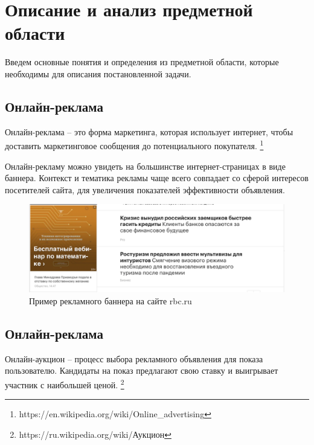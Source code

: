 \documentclass[times,specification,annotation]{itmo-student-thesis}
\begin{document}
\chapter{Описание и анализ предметной области}

Введем основные понятия и определения из предметной области, которые необходимы для описания постановленной задачи.

\section{Онлайн-реклама}

\begin{definition}
    Онлайн-реклама – это форма маркетинга, которая использует интернет,
    чтобы доставить маркетинговое сообщения до потенциального покупателя.
    \footnote{https://en.wikipedia.org/wiki/Online_advertising}
\end{definition}

Онлайн-рекламу можно увидеть на большинстве интернет-страницах в виде баннера.
Контекст и тематика рекламы чаще всего совпадает со сферой интересов посетителей сайта,
для увеличения показателей эффективности объявления.

\begin{figure}[h]
    \label{fig:banner}
    \caption{Пример рекламного баннера на сайте rbc.ru}
    \centering
    \includegraphics{banner-example.png}
\end{figure}

\section{Онлайн-реклама}

\begin{definition}
    Онлайн-аукцион – процесс выбора рекламного объявления для показа пользователю.
    Кандидаты на показ предлагают свою ставку и выигрывает участник с наибольшей ценой.
    \footnote{\label{fn:auction}https://ru.wikipedia.org/wiki/Аукцион}
\end{definition}
\end{document}
